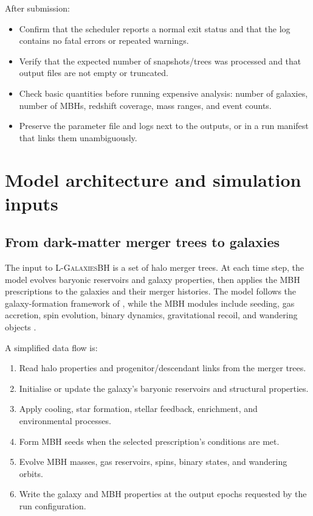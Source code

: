 \documentclass[11pt,a4paper]{article}
\newcommand{\Lgalbh}{\textsc{L-GalaxiesBH}}
\begin{document}
After submission:
\begin{itemize}
  \item Confirm that the scheduler reports a normal exit status and that the log contains no fatal errors or repeated warnings.
  \item Verify that the expected number of snapshots/trees was processed and that output files are not empty or truncated.
  \item Check basic quantities before running expensive analysis: number of galaxies, number of MBHs, redshift coverage, mass ranges, and event counts.
  \item Preserve the parameter file and logs next to the outputs, or in a run manifest that links them unambiguously.
\end{itemize}

\section{Model architecture and simulation inputs}

\subsection{From dark-matter merger trees to galaxies}

The input to \Lgalbh{} is a set of halo merger trees. At each time step, the model evolves baryonic reservoirs and galaxy properties, then applies the MBH prescriptions to the galaxies and their merger histories. The model follows the galaxy-formation framework of \citet{Henriques2015}, while the MBH modules include seeding, gas accretion, spin evolution, binary dynamics, gravitational recoil, and wandering objects \citep{Bonoli2025}.

A simplified data flow is:
\begin{enumerate}
  \item Read halo properties and progenitor/descendant links from the merger trees.
  \item Initialise or update the galaxy's baryonic reservoirs and structural properties.
  \item Apply cooling, star formation, stellar feedback, enrichment, and environmental processes.
  \item Form MBH seeds when the selected prescription's conditions are met.
  \item Evolve MBH masses, gas reservoirs, spins, binary states, and wandering orbits.
  \item Write the galaxy and MBH properties at the output epochs requested by the run configuration.
\end{enumerate}
\end{document}

